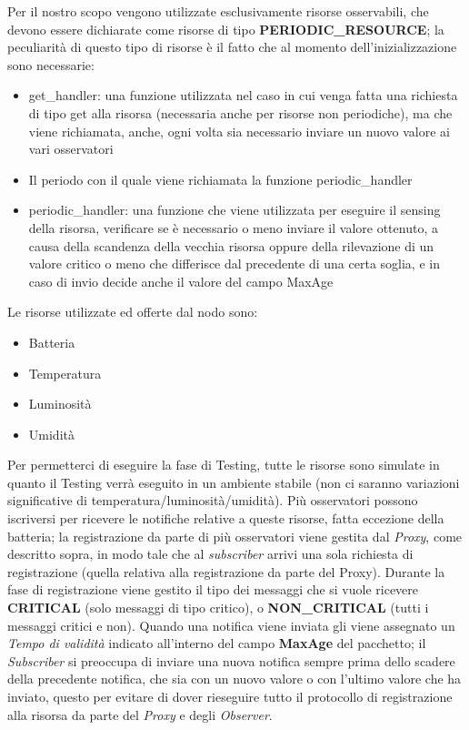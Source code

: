       Per il nostro scopo vengono utilizzate esclusivamente risorse osservabili, che devono essere dichiarate come risorse di tipo \textbf{PERIODIC\_RESOURCE};
      la peculiarità di questo tipo di risorse è il fatto che al momento dell'inizializzazione sono necessarie:
      \begin{itemize}
        \item get\_handler: una funzione utilizzata nel caso in cui venga fatta una richiesta di tipo get alla risorsa (necessaria anche per risorse non periodiche),
              ma che viene richiamata, anche, ogni volta sia necessario inviare un nuovo valore ai vari osservatori
        \item Il periodo con il quale viene richiamata la funzione periodic\_handler
        \item periodic\_handler: una funzione che viene utilizzata per eseguire il sensing della risorsa, verificare se è necessario o meno inviare il valore ottenuto, a causa
              della scandenza della vecchia risorsa oppure della rilevazione di un valore critico o meno che differisce dal precedente di una certa soglia, e in caso di invio
              decide anche il valore del campo MaxAge
      \end{itemize}
      Le risorse utilizzate ed offerte dal nodo sono:
      \begin{itemize}
        \item Batteria
        \item Temperatura
        \item Luminosità
        \item Umidità
      \end{itemize}
      Per permetterci di eseguire la fase di Testing, tutte le risorse sono simulate in quanto il Testing verrà eseguito in un ambiente stabile (non ci saranno variazioni
      significative di temperatura/luminosità/umidità).\newline
      Più osservatori possono iscriversi per ricevere le notifiche relative a queste risorse, fatta eccezione della batteria; la registrazione da parte di più osservatori
      viene gestita dal \textit{Proxy}, come descritto sopra, in modo tale che al \textit{subscriber} arrivi una sola richiesta di registrazione (quella relativa alla registrazione
      da parte del Proxy).\newline
      Durante la fase di registrazione viene gestito il tipo dei messaggi che si vuole ricevere \textbf{CRITICAL} (solo messaggi di tipo critico), o \textbf{NON\_CRITICAL} (tutti i
      messaggi critici e non).\newline
      Quando una notifica viene inviata gli viene assegnato un \textit{Tempo di validità} indicato all'interno del campo \textbf{MaxAge} del pacchetto; il \textit{Subscriber} si
      preoccupa di inviare una nuova notifica sempre prima dello scadere della precedente notifica, che sia con un nuovo valore o con l'ultimo valore che ha inviato, questo
      per evitare di dover rieseguire tutto il protocollo di registrazione alla risorsa da parte del \textit{Proxy} e degli \textit{Observer}.

